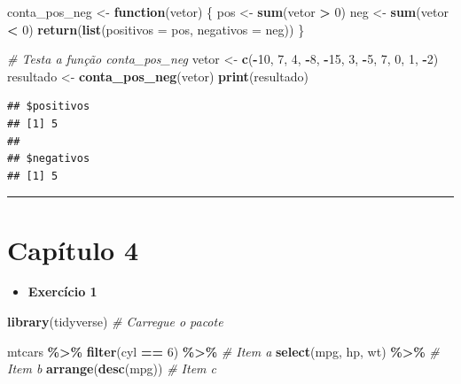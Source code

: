 \documentclass[
]{book}
\newenvironment{Shaded}{\begin{snugshade}}{\end{snugshade}}
\newcommand{\AttributeTok}[1]{\textcolor[rgb]{0.13,0.29,0.53}{#1}}
\newcommand{\CommentTok}[1]{\textcolor[rgb]{0.56,0.35,0.01}{\textit{#1}}}
\newcommand{\ControlFlowTok}[1]{\textcolor[rgb]{0.13,0.29,0.53}{\textbf{#1}}}
\newcommand{\DecValTok}[1]{\textcolor[rgb]{0.00,0.00,0.81}{#1}}
\newcommand{\FunctionTok}[1]{\textcolor[rgb]{0.13,0.29,0.53}{\textbf{#1}}}
\newcommand{\NormalTok}[1]{#1}
\newcommand{\OtherTok}[1]{\textcolor[rgb]{0.56,0.35,0.01}{#1}}
\newcommand{\SpecialCharTok}[1]{\textcolor[rgb]{0.81,0.36,0.00}{\textbf{#1}}}
\providecommand{\tightlist}{%
  \setlength{\itemsep}{0pt}\setlength{\parskip}{0pt}}
\begin{document}
\begin{Shaded}
\begin{Highlighting}[]
\NormalTok{conta\_pos\_neg }\OtherTok{\textless{}{-}} \ControlFlowTok{function}\NormalTok{(vetor) \{}
\NormalTok{  pos }\OtherTok{\textless{}{-}} \FunctionTok{sum}\NormalTok{(vetor }\SpecialCharTok{\textgreater{}} \DecValTok{0}\NormalTok{)}
\NormalTok{  neg }\OtherTok{\textless{}{-}} \FunctionTok{sum}\NormalTok{(vetor }\SpecialCharTok{\textless{}} \DecValTok{0}\NormalTok{)}
  \FunctionTok{return}\NormalTok{(}\FunctionTok{list}\NormalTok{(}\AttributeTok{positivos =}\NormalTok{ pos, }\AttributeTok{negativos =}\NormalTok{ neg))}
\NormalTok{\}}

\CommentTok{\# Testa a função \textquotesingle{}conta\_pos\_neg\textquotesingle{}}
\NormalTok{vetor }\OtherTok{\textless{}{-}} \FunctionTok{c}\NormalTok{(}\SpecialCharTok{{-}}\DecValTok{10}\NormalTok{, }\DecValTok{7}\NormalTok{, }\DecValTok{4}\NormalTok{, }\SpecialCharTok{{-}}\DecValTok{8}\NormalTok{, }\SpecialCharTok{{-}}\DecValTok{15}\NormalTok{, }\DecValTok{3}\NormalTok{, }\SpecialCharTok{{-}}\DecValTok{5}\NormalTok{, }\DecValTok{7}\NormalTok{, }\DecValTok{0}\NormalTok{, }\DecValTok{1}\NormalTok{, }\SpecialCharTok{{-}}\DecValTok{2}\NormalTok{)}
\NormalTok{resultado }\OtherTok{\textless{}{-}} \FunctionTok{conta\_pos\_neg}\NormalTok{(vetor)}
\FunctionTok{print}\NormalTok{(resultado)}
\end{Highlighting}
\end{Shaded}

\begin{verbatim}
## $positivos
## [1] 5
## 
## $negativos
## [1] 5
\end{verbatim}

\begin{center}\rule{0.5\linewidth}{0.5pt}\end{center}

\section{Capítulo 4}\label{capuxedtulo-4}

\begin{itemize}
\tightlist
\item
  \textbf{Exercício 1}
\end{itemize}

\begin{Shaded}
\begin{Highlighting}[]
\FunctionTok{library}\NormalTok{(tidyverse) }\CommentTok{\# Carregue o pacote}

\NormalTok{mtcars }\SpecialCharTok{\%\textgreater{}\%} 
  \FunctionTok{filter}\NormalTok{(cyl }\SpecialCharTok{==} \DecValTok{6}\NormalTok{) }\SpecialCharTok{\%\textgreater{}\%} \CommentTok{\# Item a}
  \FunctionTok{select}\NormalTok{(mpg, hp, wt) }\SpecialCharTok{\%\textgreater{}\%} \CommentTok{\# Item b}
  \FunctionTok{arrange}\NormalTok{(}\FunctionTok{desc}\NormalTok{(mpg)) }\CommentTok{\# Item c}
\end{Highlighting}
\end{Shaded}
\end{document}
